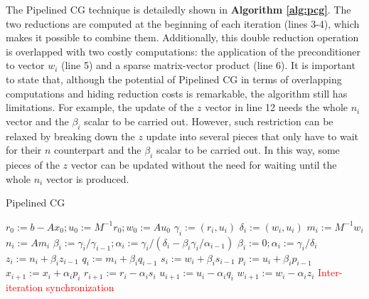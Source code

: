 The Pipelined CG technique is detailedly shown in \textbf{Algorithm \ref{alg:pcg}}. 
The two reductions are computed at the beginning of each iteration (lines 3-4), which makes it possible to combine them. 
Additionally, this double reduction operation is overlapped with two costly computations: the application of the preconditioner to vector $w_i$ (line 5) and a sparse matrix-vector product (line 6).
It is important to state that, although the potential of Pipelined CG in terms of overlapping computations and hiding reduction costs is remarkable, the algorithm still has limitations.
For example, the update of the $z$ vector in line 12 needs the whole $n_i$ vector and the $\beta_{i}$ scalar to be carried out.
However, such restriction can be relaxed by breaking down the $z$ update into several pieces that only have to wait for their $n$ counterpart and the $\beta_{i}$ scalar to be carried out.
In this way, some pieces of the $z$ vector can be updated without the need for waiting until the whole $n_i$ vector is produced.   


\begin{algorithm}[t]%
\caption{Pipelined CG}
\label{alg:pcg}
{\fontsize{9}{9}\selectfont
\begin{algorithmic}[1]
	\State $r_{0} := b - Ax_{0}; u_{0} := M^{-1}r_{0}; w_{0} := Au_{0}$ 
		\State $\gamma_{i} := (r_{i}, u_{i})$
		\State $\delta_i := (w_{i}, u_{i})$
		\State $m_{i} := M^{-1}w_{i}$
		\State $n_{i} := Am_{i}$
			\State $\beta_{i} := \gamma_{i}/\gamma_{i-1}; \alpha_{i} := \gamma_{i}/(\delta_i - \beta_{i}\gamma_{i}/\alpha_{i-1})$
		\Else
			\State $\beta_{i} := 0; \alpha_{i} := \gamma_{i}/\delta_i$
		\EndIf
		\State $z_{i} := n_{i} + \beta_{i}z_{i-1}$
		\State $q_{i} := m_{i} + \beta_{i}q_{i-1}$
		\State $s_{i} := w_{i} + \beta_{i}s_{i-1}$
		\State $p_{i} := u_{i} + \beta_{i}p_{i-1}$
		\State $x_{i+1} := x_{i} + \alpha_{i}p_{i}$
		\State $r_{i+1} := r_{i} - \alpha_{i}s_{i}$
		\State $u_{i+1} := u_{i} - \alpha_{i}q_{i}$
		\State $w_{i+1} := w_{i} - \alpha_{i}z_{i}$
	\EndFor
	\State \textcolor{red} {Inter-iteration synchronization}
\end{algorithmic}
}
\end{algorithm}
